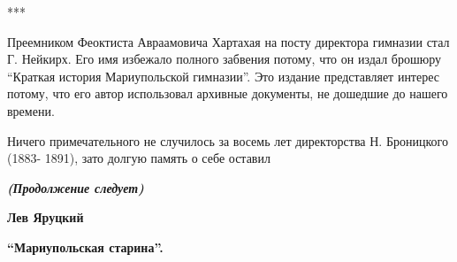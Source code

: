 ***

Преемником Феоктиста Авраамовича Хартахая на посту директора гимназии стал Г.
Нейкирх. Его имя избежало полного забвения потому, что он издал брошюру
\enquote{Краткая история Мариупольской гимназии}. Это издание представляет интерес
потому, что его автор использовал архивные документы, не дошедшие до нашего
времени.

Ничего примечательного не случилось за восемь лет директорства Н. Броницкого
(1883- 1891), зато долгую память о себе оставил

\bigskip
\emph{\textbf{(Продолжение следует)}}\par

\bigskip
\textbf{Лев Яруцкий}\par

\bigskip
\textbf{\enquote{Мариупольская старина}.}


